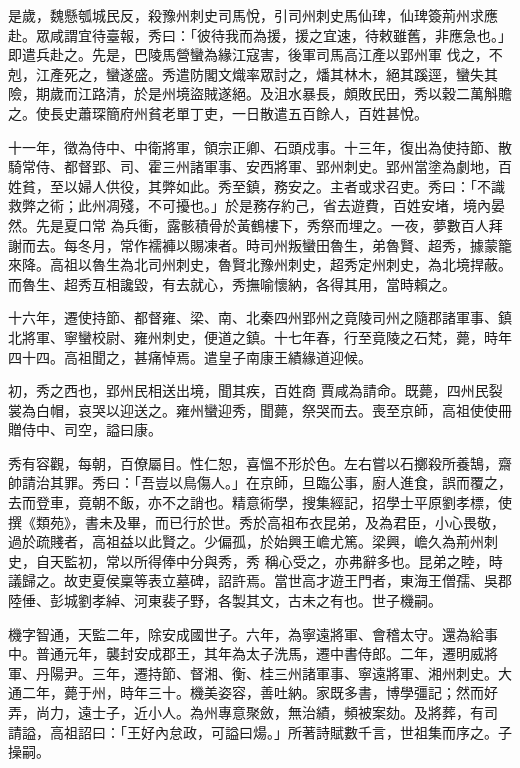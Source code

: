 \begin{pinyinscope}
 是歲，魏懸瓠城民反，殺豫州刺史司馬悅，引司州刺史馬仙琕，仙琕簽荊州求應赴。眾咸謂宜待臺報，秀曰：「彼待我而為援，援之宜速，待敕雖舊，非應急也。」即遣兵赴之。先是，巴陵馬營蠻為緣江寇害，後軍司馬高江產以郢州軍
 伐之，不剋，江產死之，蠻遂盛。秀遣防閣文熾率眾討之，燔其林木，絕其蹊逕，蠻失其險，期歲而江路清，於是州境盜賊遂絕。及沮水暴長，頗敗民田，秀以穀二萬斛贍之。使長史蕭琛簡府州貧老單丁吏，一日散遣五百餘人，百姓甚悅。



 十一年，徵為侍中、中衛將軍，領宗正卿、石頭戍事。十三年，復出為使持節、散騎常侍、都督郢、司、霍三州諸軍事、安西將軍、郢州刺史。郢州當塗為劇地，百姓貧，至以婦人供役，其弊如此。秀至鎮，務安之。主者或求召吏。秀曰：「不識救弊之術；此州凋殘，不可擾也。」於是務存約己，省去遊費，百姓安堵，境內晏然。先是夏口常
 為兵衝，露骸積骨於黃鶴樓下，秀祭而埋之。一夜，夢數百人拜謝而去。每冬月，常作襦褲以賜凍者。時司州叛蠻田魯生，弟魯賢、超秀，據蒙籠來降。高祖以魯生為北司州刺史，魯賢北豫州刺史，超秀定州刺史，為北境捍蔽。而魯生、超秀互相讒毀，有去就心，秀撫喻懷納，各得其用，當時賴之。



 十六年，遷使持節、都督雍、梁、南、北秦四州郢州之竟陵司州之隨郡諸軍事、鎮北將軍、寧蠻校尉、雍州刺史，便道之鎮。十七年春，行至竟陵之石梵，薨，時年四十四。高祖聞之，甚痛悼焉。遣皇子南康王績緣道迎候。



 初，秀之西也，郢州民相送出境，聞其疾，百姓商
 賈咸為請命。既薨，四州民裂裳為白帽，哀哭以迎送之。雍州蠻迎秀，聞薨，祭哭而去。喪至京師，高祖使使冊贈侍中、司空，謚曰康。



 秀有容觀，每朝，百僚屬目。性仁恕，喜慍不形於色。左右嘗以石擲殺所養鵠，齋帥請治其罪。秀曰：「吾豈以鳥傷人。」在京師，旦臨公事，廚人進食，誤而覆之，去而登車，竟朝不飯，亦不之誚也。精意術學，搜集經記，招學士平原劉孝標，使撰《類苑》，書未及畢，而已行於世。秀於高祖布衣昆弟，及為君臣，小心畏敬，過於疏賤者，高祖益以此賢之。少偏孤，於始興王嶦尤篤。梁興，嶦久為荊州刺史，自天監初，常以所得俸中分與秀，秀
 稱心受之，亦弗辭多也。昆弟之睦，時議歸之。故吏夏侯稟等表立墓碑，詔許焉。當世高才遊王門者，東海王僧孺、吳郡陸倕、彭城劉孝綽、河東裴子野，各製其文，古未之有也。世子機嗣。



 機字智通，天監二年，除安成國世子。六年，為寧遠將軍、會稽太守。還為給事中。普通元年，襲封安成郡王，其年為太子洗馬，遷中書侍郎。二年，遷明威將軍、丹陽尹。三年，遷持節、督湘、衡、桂三州諸軍事、寧遠將軍、湘州刺史。大通二年，薨于州，時年三十。機美姿容，善吐納。家既多書，博學彊記；然而好弄，尚力，遠士子，近小人。為州專意聚斂，無治績，頻被案劾。及將葬，有司
 請謚，高祖詔曰：「王好內怠政，可謚曰煬。」所著詩賦數千言，世祖集而序之。子操嗣。




\end{pinyinscope}
